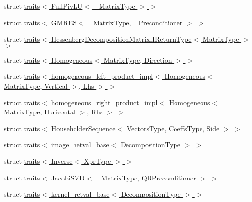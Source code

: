 \begin{DoxyCompactItemize}
\item 
struct \hyperlink{struct_eigen_1_1internal_1_1traits_3_01_full_piv_l_u_3_01___matrix_type_01_4_01_4}{traits$<$ Full\+Piv\+L\+U$<$ \+\_\+\+Matrix\+Type $>$ $>$}
\item 
struct \hyperlink{struct_eigen_1_1internal_1_1traits_3_01_g_m_r_e_s_3_01___matrix_type_00_01___preconditioner_01_4_01_4}{traits$<$ G\+M\+R\+E\+S$<$ \+\_\+\+Matrix\+Type, \+\_\+\+Preconditioner $>$ $>$}
\item 
struct \hyperlink{struct_eigen_1_1internal_1_1traits_3_01_hessenberg_decomposition_matrix_h_return_type_3_01_matrix_type_01_4_01_4}{traits$<$ Hessenberg\+Decomposition\+Matrix\+H\+Return\+Type$<$ Matrix\+Type $>$ $>$}
\item 
struct \hyperlink{struct_eigen_1_1internal_1_1traits_3_01_homogeneous_3_01_matrix_type_00_01_direction_01_4_01_4}{traits$<$ Homogeneous$<$ Matrix\+Type, Direction $>$ $>$}
\item 
struct \hyperlink{struct_eigen_1_1internal_1_1traits_3_01homogeneous__left__product__impl_3_01_homogeneous_3_01_ma5f6080eece96c58f7d2ccea57ec7242b}{traits$<$ homogeneous\+\_\+left\+\_\+product\+\_\+impl$<$ Homogeneous$<$ Matrix\+Type, Vertical $>$, Lhs $>$ $>$}
\item 
struct \hyperlink{struct_eigen_1_1internal_1_1traits_3_01homogeneous__right__product__impl_3_01_homogeneous_3_01_mc10ae8b83e72e7ac1f6457e2d5f54a0a}{traits$<$ homogeneous\+\_\+right\+\_\+product\+\_\+impl$<$ Homogeneous$<$ Matrix\+Type, Horizontal $>$, Rhs $>$ $>$}
\item 
struct \hyperlink{struct_eigen_1_1internal_1_1traits_3_01_householder_sequence_3_01_vectors_type_00_01_coeffs_type_00_01_side_01_4_01_4}{traits$<$ Householder\+Sequence$<$ Vectors\+Type, Coeffs\+Type, Side $>$ $>$}
\item 
struct \hyperlink{struct_eigen_1_1internal_1_1traits_3_01image__retval__base_3_01_decomposition_type_01_4_01_4}{traits$<$ image\+\_\+retval\+\_\+base$<$ Decomposition\+Type $>$ $>$}
\item 
struct \hyperlink{struct_eigen_1_1internal_1_1traits_3_01_inverse_3_01_xpr_type_01_4_01_4}{traits$<$ Inverse$<$ Xpr\+Type $>$ $>$}
\item 
struct \hyperlink{struct_eigen_1_1internal_1_1traits_3_01_jacobi_s_v_d_3_01___matrix_type_00_01_q_r_preconditioner_01_4_01_4}{traits$<$ Jacobi\+S\+V\+D$<$ \+\_\+\+Matrix\+Type, Q\+R\+Preconditioner $>$ $>$}
\item 
struct \hyperlink{struct_eigen_1_1internal_1_1traits_3_01kernel__retval__base_3_01_decomposition_type_01_4_01_4}{traits$<$ kernel\+\_\+retval\+\_\+base$<$ Decomposition\+Type $>$ $>$}

\end{DoxyCompactItemize}
